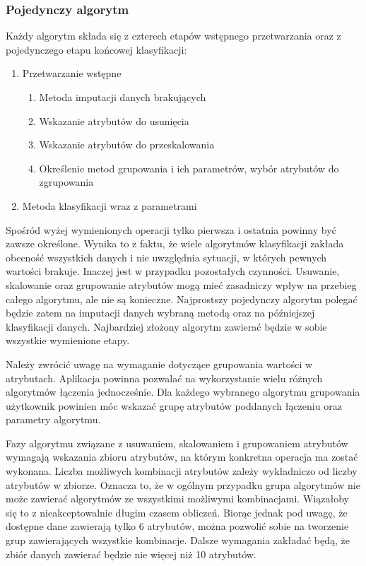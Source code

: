 \documentclass[../thesis.tex]{subfiles}
\begin{document}
\subsubsection{Pojedynczy algorytm}

Każdy algorytm składa się z czterech etapów wstępnego przetwarzania oraz z pojedynczego etapu końcowej klasyfikacji:
\begin{enumerate}
	\item Przetwarzanie wstępne
	\begin{enumerate}
		\item Metoda imputacji danych brakujących
		\item Wskazanie atrybutów do usunięcia
		\item Wskazanie atrybutów do przeskalowania
		\item Określenie metod grupowania i ich parametrów, wybór atrybutów do zgrupowania
	\end{enumerate}
	\item Metoda klasyfikacji wraz z parametrami
\end{enumerate}

Spośród wyżej wymienionych operacji tylko pierwsza i ostatnia powinny być zawsze określone. Wynika to z faktu, że wiele algorytmów klasyfikacji zakłada obecność wszystkich danych i nie uwzględnia sytuacji, w których pewnych wartości brakuje. Inaczej jest w przypadku pozostałych czynności. Usuwanie, skalowanie oraz grupowanie atrybutów mogą mieć zasadniczy wpływ na przebieg całego algorytmu, ale nie są konieczne. Najprostszy pojedynczy algorytm polegać będzie zatem na imputacji danych wybraną metodą oraz na późniejszej klasyfikacji danych. Najbardziej złożony algorytm zawierać będzie w sobie wszystkie wymienione etapy. 

Należy zwrócić uwagę na wymaganie dotyczące grupowania wartości w atrybutach. Aplikacja powinna pozwalać na wykorzystanie wielu różnych algorytmów łączenia jednocześnie. Dla każdego wybranego algorytmu grupowania użytkownik powinien móc wskazać grupę atrybutów poddanych łączeniu oraz parametry algorytmu.

Fazy algorytmu związane z usuwaniem, skalowaniem i grupowaniem atrybutów wymagają wskazania zbioru atrybutów, na którym konkretna operacja ma zostać wykonana. Liczba możliwych kombinacji atrybutów zależy wykładniczo od liczby atrybutów w zbiorze. Oznacza to, że w ogólnym przypadku grupa algorytmów nie może zawierać algorytmów ze wszystkimi możliwymi kombinacjami. Wiązałoby się to z nieakceptowalnie długim czasem obliczeń. Biorąc jednak pod uwagę, że dostępne dane zawierają tylko 6 atrybutów, można pozwolić sobie na tworzenie grup zawierających wszystkie kombinacje. Dalsze wymagania zakładać będą, że zbiór danych zawierać będzie nie więcej niż 10 atrybutów.
\end{document}
